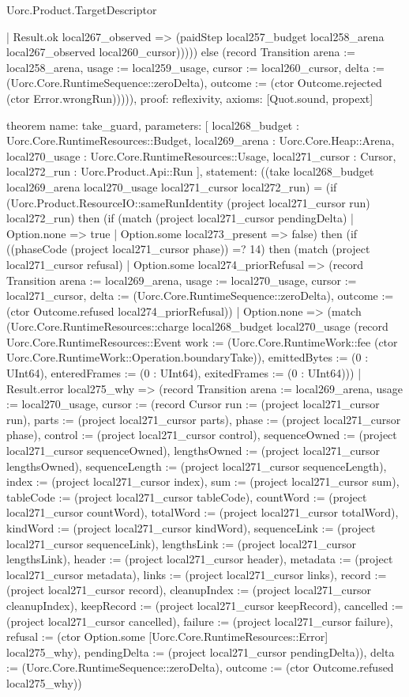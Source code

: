 \begin{lexlean}{Uorc.Product.TargetDescriptor}
\begin{semanticmodule}
{          | Result.ok local267_observed => (paidStep local257_budget local258_arena local267_observed local260_cursor))))) else (record Transition {arena := local258_arena, usage := local259_usage, cursor := local260_cursor, delta := (Uorc.Core.RuntimeSequence::zeroDelta), outcome := (ctor Outcome.rejected (ctor Error.wrongRun))}))),
  proof: reflexivity{},
  axioms: [Quot.sound, propext]
}

theorem{
  name: take_guard,
  parameters: [
    local268_budget : Uorc.Core.RuntimeResources::Budget,
    local269_arena : Uorc.Core.Heap::Arena,
    local270_usage : Uorc.Core.RuntimeResources::Usage,
    local271_cursor : Cursor,
    local272_run : Uorc.Product.Api::Run
  ],
  statement: ((take local268_budget local269_arena local270_usage local271_cursor local272_run) = (if (Uorc.Product.ResourceIO::sameRunIdentity (project local271_cursor run) local272_run) then (if (match (project local271_cursor pendingDelta)
    | Option.none => true
    | Option.some local273_present => false) then (if ((phaseCode (project local271_cursor phase)) =? 14) then (match (project local271_cursor refusal)
    | Option.some local274_priorRefusal => (record Transition {arena := local269_arena, usage := local270_usage, cursor := local271_cursor, delta := (Uorc.Core.RuntimeSequence::zeroDelta), outcome := (ctor Outcome.refused local274_priorRefusal)})
    | Option.none => (match (Uorc.Core.RuntimeResources::charge local268_budget local270_usage (record Uorc.Core.RuntimeResources::Event {work := (Uorc.Core.RuntimeWork::fee (ctor Uorc.Core.RuntimeWork::Operation.boundaryTake)), emittedBytes := (0 : UInt64), enteredFrames := (0 : UInt64), exitedFrames := (0 : UInt64)}))
      | Result.error local275_why => (record Transition {arena := local269_arena, usage := local270_usage, cursor := (record Cursor {run := (project local271_cursor run), parts := (project local271_cursor parts), phase := (project local271_cursor phase), control := (project local271_cursor control), sequenceOwned := (project local271_cursor sequenceOwned), lengthsOwned := (project local271_cursor lengthsOwned), sequenceLength := (project local271_cursor sequenceLength), index := (project local271_cursor index), sum := (project local271_cursor sum), tableCode := (project local271_cursor tableCode), countWord := (project local271_cursor countWord), totalWord := (project local271_cursor totalWord), kindWord := (project local271_cursor kindWord), sequenceLink := (project local271_cursor sequenceLink), lengthsLink := (project local271_cursor lengthsLink), header := (project local271_cursor header), metadata := (project local271_cursor metadata), links := (project local271_cursor links), record := (project local271_cursor record), cleanupIndex := (project local271_cursor cleanupIndex), keepRecord := (project local271_cursor keepRecord), cancelled := (project local271_cursor cancelled), failure := (project local271_cursor failure), refusal := (ctor Option.some [Uorc.Core.RuntimeResources::Error] local275_why), pendingDelta := (project local271_cursor pendingDelta)}), delta := (Uorc.Core.RuntimeSequence::zeroDelta), outcome := (ctor Outcome.refused local275_why)})
}
\end{semanticmodule}
\end{lexlean}

